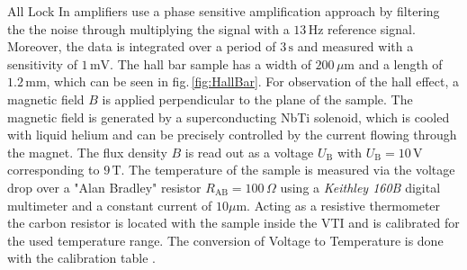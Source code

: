 All Lock In amplifiers use a phase sensitive amplification approach by filtering the the noise through multiplying the signal
with a $13\,\text{Hz}$ reference signal. Moreover, the data is integrated over a period of $3\,\text{s}$ and measured with a sensitivity of $1\,\text{mV}$.
The hall bar sample has a width of $200\,\mu\text{m}$ and a length of $1.2\,\text{mm}$, which can be seen in fig.\,\ref{fig:HallBar}.
For observation of the hall effect, a magnetic field $B$ is applied perpendicular to the plane of the sample.
The magnetic field is generated by a superconducting NbTi solenoid, which is cooled with liquid helium and can
be precisely controlled by the current flowing through the magnet. The flux density $B$ is read out as a voltage
$U_\text{B}$ with $U_\text{B}=10\,\text{V}$ corresponding to $9\,\text{T}$. The temperature of the sample is measured
via the voltage drop over a "Alan Bradley" resistor $R_\text{AB}=100\,\Omega$ using a \emph{Keithley 160B} digital multimeter and a constant current of $10\mu\text{m}$.
Acting as a resistive thermometer the carbon resistor is located with the sample inside the VTI and is calibrated for the used temperature range.
The conversion of Voltage to Temperature is done with the calibration table \cite{ExperimentDescription}.


